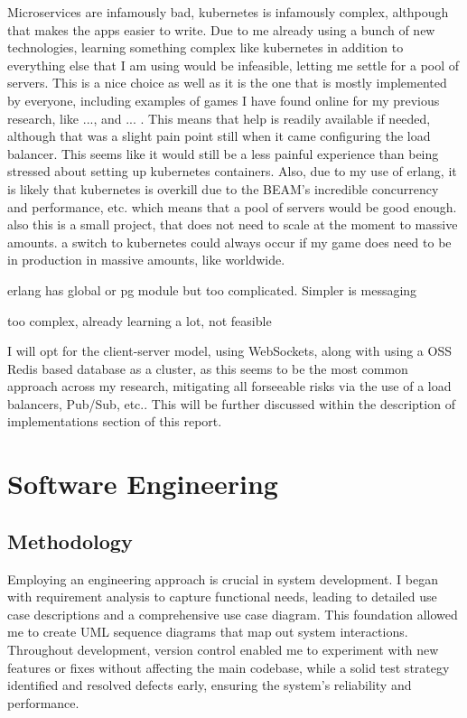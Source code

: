 \documentclass[]{final}
\begin{document}
Microservices are infamously bad, kubernetes is infamously complex, althpough
that makes the apps easier to write. Due to me already using a bunch of new
technologies, learning something complex like kubernetes in addition to
everything else that I am using would be infeasible, letting me settle for
a pool of servers. This is a nice choice as well as it is the one that
is mostly implemented by everyone, including examples of games I have found
online for my previous research, like ..., and ... . This means that help
is readily available if needed, although that was a slight pain point still
when it came configuring the load balancer. This seems like it would still
be a less painful experience than being stressed about setting up kubernetes
containers. Also, due to my use of erlang, it is likely that kubernetes is
overkill due to the BEAM's incredible concurrency and performance, etc. which
means that a pool of servers would be good enough. also this is a small project,
that does not need to scale at the moment to massive amounts.
a switch to kubernetes could always occur if my game does need to be in
production in massive amounts, like worldwide.

erlang has global or pg module but too complicated. Simpler is messaging

too complex, already learning a lot, not feasible


I will opt for the client-server model, using WebSockets, along with using a OSS Redis based database as a cluster,
as this seems to be the most common approach
across my research, mitigating all forseeable risks via the use of a load balancers,
Pub/Sub, etc.. This will be further discussed within the description of implementations section of this report.

\chapter{Software Engineering}

\section{Methodology}
Employing an engineering approach is crucial in system development. I began with
requirement analysis to capture functional needs, leading to detailed use case
descriptions and a comprehensive use case diagram. This foundation allowed me to
create UML sequence diagrams that map out system interactions. Throughout development,
version control enabled me to experiment with new features or fixes without
affecting the main codebase, while a solid test strategy identified and resolved
defects early, ensuring the system's reliability and performance.
\end{document}
